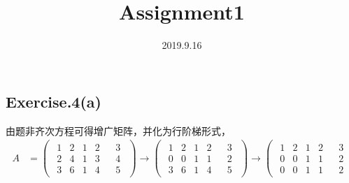 \documentclass[UTF8,12pt, a4paper,fleqn]{ctexart}
\title{Assignment1}
\author{2019.9.16}
\date{}
\begin{document}
  \maketitle
  \subsection*{Exercise.4(a)}
由题非齐次方程可得增广矩阵，并化为行阶梯形式，\\
  \begin{equation*}
  \begin{split}
    A&=\left(
      \begin{array}{c|c}
        \begin{matrix}
          1 & 2 & 1 & 2 \\
          2 & 4 & 1 & 3 \\
          3 & 6 & 1 & 4 
        \end{matrix} & 
        \begin{matrix}
          3 \\
          4 \\
          5
        \end{matrix}
      \end{array}
    \right) \rightarrow
    \left(
      \begin{array}{c|c}
        \begin{matrix}
          1 & 2 & 1 & 2 \\
          0 & 0 & 1 & 1 \\
          3 & 6 & 1 & 4 
        \end{matrix} & 
        \begin{matrix}
          3 \\
          2 \\
          5
        \end{matrix}
      \end{array}
    \right) \rightarrow
    \left(
      \begin{array}{c|c}
        \begin{matrix}
          1 & 2 & 1 & 2 \\
          0 & 0 & 1 & 1 \\
          0 & 0 & 1 & 1 
        \end{matrix} & 
        \begin{matrix}
          3 \\
          2 \\
          2
        \end{matrix}
      \end{array}

\end{split}
\end{equation*}
\end{document}
